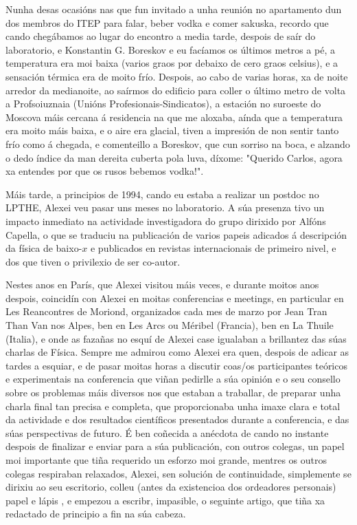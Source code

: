 \begin{refsection}
\begin{multicols}{2}
Nunha desas ocasións nas que fun invitado a unha reunión no apartamento dun dos membros do ITEP para falar, beber vodka e comer sakuska, recordo que cando chegábamos ao lugar do encontro a media tarde, despois de saír do laboratorio, e Konstantin G. Boreskov e eu facíamos os últimos metros a pé, a temperatura era moi baixa (varios graos por debaixo de cero graos celsius), e a sensación térmica era de moito frío. Despois, ao cabo de varias horas, xa de noite arredor da medianoite, ao saírmos do edificio para coller o último metro de volta a Profsoiuznaia (Unións Profesionais-Sindicatos), a estación no suroeste do Moscova máis cercana á residencia na que me aloxaba, aínda que a temperatura era moito máis baixa, e o aire era glacial, tiven a impresión de non sentir tanto frío como á chegada, e comenteillo a Boreskov, que cun sorriso na boca, e alzando o dedo índice da man dereita cuberta pola luva, díxome: "Querido Carlos, agora xa entendes por que os rusos bebemos vodka!".

Máis tarde, a principios de 1994, cando eu estaba a realizar un postdoc no LPTHE, Alexei veu pasar uns meses no laboratorio. A súa presenza tivo un impacto inmediato na actividade investigadora do grupo dirixido por Alfóns Capella, o que se traduciu na publicación de varios papeis adicados á descripción da física de baixo-$x$ e publicados en revistas internacionais de primeiro nivel, e dos que tiven o privilexio de ser co-autor.

Nestes anos en París, que Alexei visitou máis veces, e durante moitos anos despois, coincidín con Alexei en moitas conferencias e meetings, en particular en Les Reancontres de Moriond, organizados cada mes de marzo por Jean Tran Than Van nos Alpes, ben en Les Arcs ou Méribel (Francia), ben en La Thuile (Italia), e onde as fazañas no esquí de Alexei case igualaban a brillantez das súas charlas de Física. Sempre me admirou como Alexei era quen, despois de adicar as tardes a esquiar, e de pasar moitas horas a discutir coas/os participantes teóricos e experimentais na conferencia que viñan pedirlle a súa opinión e o seu consello sobre os problemas máis diversos nos que estaban a traballar, de preparar unha charla final tan precisa e completa, que proporcionaba unha imaxe clara e total da actividade e dos resultados científicos presentados durante a conferencia, e das súas perspectivas de futuro. É ben coñecida a anécdota de cando no instante despois de finalizar e enviar para a súa publicación, con outros colegas, un papel moi importante que tiña requerido un esforzo moi grande, mentres os outros colegas respiraban relaxados, Alexei, sen solución de continuidade, simplemente se dirixiu ao seu escritorio, colleu (antes da existencioa dos ordeadores personais) papel e lápis , e empezou a escribr, impasible, o seguinte artigo, que tiña xa redactado de principio a fin na súa cabeza.


\end{multicols}
\end{refsection}
